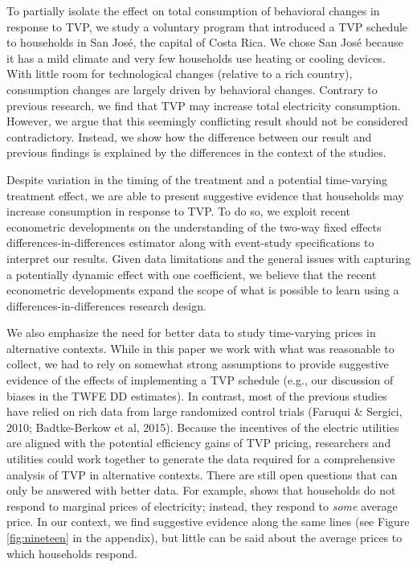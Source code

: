 \documentclass[12pt]{article}
\begin{document}
To partially isolate the effect on total consumption of behavioral changes in response to TVP, we study a voluntary program that introduced a TVP schedule to households in San José, the capital of Costa Rica. We chose San José because it has a mild climate and very few households use heating or cooling devices. With little room for technological changes (relative to a rich country), consumption changes are largely driven by behavioral changes. Contrary to previous research, we find that TVP may increase total electricity consumption. However, we argue that this seemingly conflicting result should not be considered contradictory. Instead, we show how the difference between our result and previous findings is explained by the differences in the context of the studies.

Despite variation in the timing of the treatment and a potential time-varying treatment effect, we are able to present suggestive evidence that households may increase consumption in response to TVP. To do so, we exploit recent econometric developments on the understanding of the two-way fixed effects differences-in-differences estimator \citep{goodman-baconDifferenceinDifferencesVariationTreatment2018} along with event-study specifications to interpret our results. Given data limitations and the general issues with capturing a potentially dynamic effect with one coefficient, we believe that the recent econometric developments expand the scope of what is possible to learn using a differences-in-differences research design.

We also emphasize the need for better data to study time-varying prices in alternative contexts. While in this paper we work with what was reasonable to collect, we had to rely on somewhat strong assumptions to provide suggestive evidence of the effects of implementing a TVP schedule (e.g., our discussion of biases in the TWFE DD estimates). In contrast, most of the previous studies have relied on rich data from large randomized control trials (Faruqui $\&$  Sergici, 2010; Badtke-Berkow et al, 2015). Because the incentives of the electric utilities are aligned with the potential efficiency gains of TVP pricing, researchers and utilities could work together to generate the data required for a comprehensive analysis of TVP in alternative contexts. There are still open questions that can only be answered with better data. For example, \citep{itoConsumersRespondMarginal2014} shows that households do not respond to marginal prices of electricity; instead, they respond to \emph{some} average price. In our context, we find suggestive evidence along the same lines (see Figure \ref{fig:nineteen} in the appendix), but little can be said about the average prices to which households respond.
\end{document}
